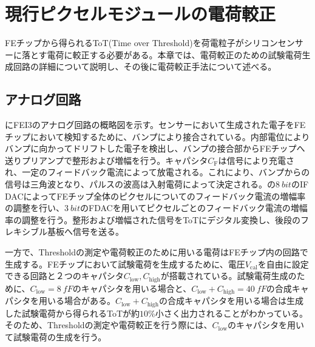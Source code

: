 \chapter{現行ピクセルモジュールの電荷較正}
\label{sec:chap3}

FEチップから得られるToT(Time over Threshold)を荷電粒子がシリコンセンサーに落とす電荷に較正する必要がある。本章では、電荷較正のための試験電荷生成回路の詳細について説明し、その後に電荷較正手法について述べる。

\section{アナログ回路}
\label{sec:analog}
にFEI3のアナログ回路の概略図を示す。センサーにおいて生成された電子をFEチップにおいて検知するために、バンプにより接合されている。内部電位によりバンプに向かってドリフトした電子を検出し、バンプの接合部からFEチップへ送りプリアンプで整形および増幅を行う。キャパシタ$C_\mathrm{F}$は信号により充電され、一定のフィードバック電流によって放電される。これにより、バンプからの信号は三角波となり、パルスの波高は入射電荷によって決定される。の$8\ \si{bit}$のIF DACによってFEチップ全体のピクセルについてのフィードバック電流の増幅率の調整を行い、$3\ \si{bit}$のFDACを用いてピクセルごとのフィードバック電流の増幅率の調整を行う。整形および増幅された信号をToTにデジタル変換し、後段のフレキシブル基板へ信号を送る。

一方で、Thresholdの測定や電荷較正のために用いる電荷はFEチップ内の回路で生成する。FEチップにおいて試験電荷を生成するために、電圧$V_\mathrm{cal}$を自由に設定できる回路と２つのキャパシタ$C_\mathrm{low}, C_\mathrm{high}$が搭載されている。試験電荷生成のために、$C_\mathrm{low}=8\ \si{fF}$のキャパシタを用いる場合と、$C_\mathrm{low}+C_\mathrm{high}=40\ \si{fF}$の合成キャパシタを用いる場合がある。$C_\mathrm{low}+C_\mathrm{high}$の合成キャパシタを用いる場合は生成した試験電荷から得られるToTが約$10\%$小さく出力されることがわかっている。そのため、Thresholdの測定や電荷較正を行う際には、$C_\mathrm{low}$のキャパシタを用いて試験電荷の生成を行う。

